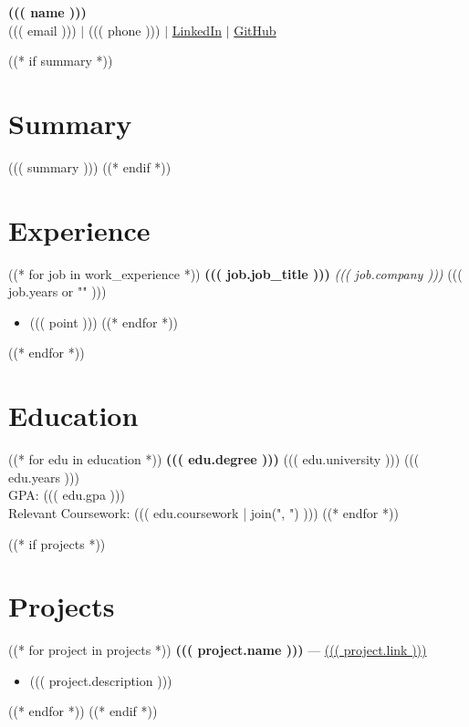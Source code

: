 \documentclass[a4paper,10pt]{article}
\begin{document}
\begin{center}
    {\LARGE \textbf{((( name )))}}\\
    ((( email ))) $|$ ((( phone ))) $|$ \href{((( linkedin )))}{LinkedIn} $|$ \href{((( github )))}{GitHub}
\end{center}

((* if summary *))
\section*{Summary}
((( summary )))
((* endif *))

\section*{Experience}
((* for job in work_experience *))
\textbf{((( job.job_title )))} \hfill \textit{((( job.company )))} \hfill ((( job.years or "" )))\\
\begin{itemize}[leftmargin=1.5em]
    ((* for point in job.bullet_points *))
    \item ((( point )))
    ((* endfor *))
\end{itemize}
((* endfor *))

\section*{Education}
((* for edu in education *))
\textbf{((( edu.degree )))} \hfill ((( edu.university ))) \hfill ((( edu.years )))\\
GPA: ((( edu.gpa )))\\
Relevant Coursework: ((( edu.coursework | join(", ") )))
((* endfor *))

((* if projects *))
\section*{Projects}
((* for project in projects *))
\textbf{((( project.name )))} --- \href{((( project.link )))}{((( project.link )))}
\begin{itemize}[leftmargin=1.5em]
    \item ((( project.description )))
\end{itemize}
((* endfor *))
((* endif *))
\end{document}
